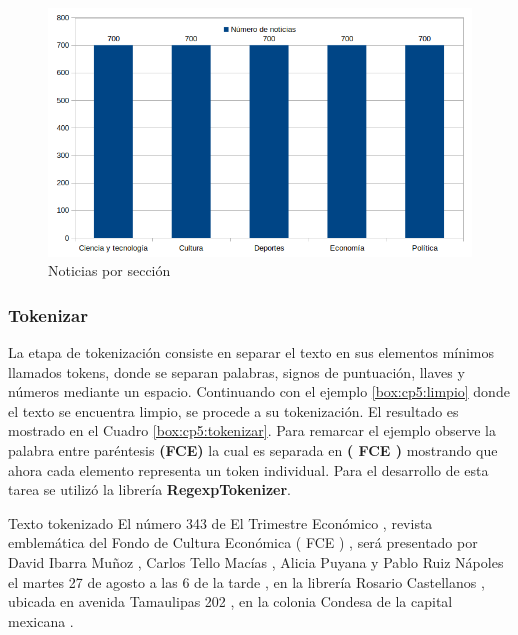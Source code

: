\begin{figure}[H]
	\centering
	\includegraphics[scale=.5]{imagenes/Capitulo5/noticiasBalanceadas.png}
	\caption{Noticias por sección}
	\label{fig:notBalanceadas}
\end{figure}

\subsubsection{Tokenizar}
La etapa de tokenización consiste en separar el texto en sus elementos mínimos llamados tokens, donde se separan palabras, signos de puntuación, llaves y números mediante un espacio. Continuando con el ejemplo \ref{box:cp5:limpio} donde el texto se encuentra limpio, se procede a su tokenización. El resultado es mostrado en el Cuadro \ref{box:cp5:tokenizar}. Para remarcar el ejemplo observe la palabra entre paréntesis \textbf{(FCE)} la cual es separada en \textbf{( FCE )} mostrando que ahora cada elemento representa un token individual. Para el desarrollo de esta tarea se utilizó la librería \textbf{RegexpTokenizer}.\\

\begin{mygraybox}[label={box:cp5:tokenizar}]{Texto tokenizado} 
El número 343 de El Trimestre Económico , revista emblemática del Fondo de Cultura 
Económica ( FCE ) , será presentado por David Ibarra Muñoz , Carlos Tello Macías , Alicia Puyana y Pablo Ruiz Nápoles el martes 27 de agosto a las 6 de la tarde , en la librería Rosario Castellanos , ubicada en avenida Tamaulipas 202 , en la colonia Condesa de la capital mexicana .
\end{mygraybox}

